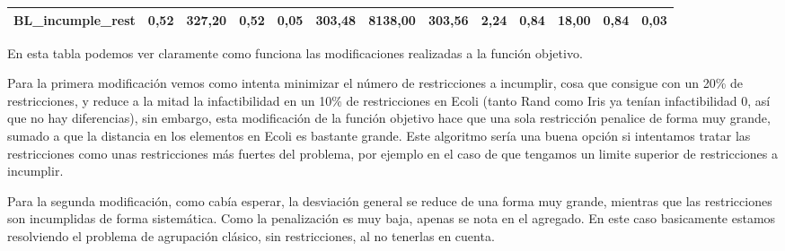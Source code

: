 \documentclass[12pt, spanish]{article}
\begin{document}
\begin{table}[H]
\begin{adjustwidth}{-1.9cm}{-1.9cm}
\begin{tabular}{|l|c|c|c|c|c|c|c|c|c|c|c|c|}
BL\_incumple\_rest                                      & 0,52                         & 327,20                         & 0,52                      & 0,05                   & 303,48                       & 8138,00                        & 303,56                    & 2,24                   & 0,84                         & 18,00                          & 0,84                      & 0,03               \\ \hline   
\end{tabular}

\end{adjustwidth}
\end{table}

En esta tabla podemos ver claramente como funciona las modificaciones realizadas a la función objetivo.

Para la primera modificación vemos como intenta minimizar el número de restricciones a incumplir, cosa que consigue con un 20\% de restricciones, y reduce a la mitad la infactibilidad en un 10\% de restricciones en Ecoli (tanto Rand como Iris ya tenían infactibilidad 0, así que no hay diferencias), sin embargo, esta modificación de la función objetivo hace que una sola restricción penalice de forma muy grande, sumado a que la distancia en los elementos en Ecoli es bastante grande. Este algoritmo sería una buena opción si intentamos tratar las restricciones como unas restricciones más fuertes del problema, por ejemplo en el caso de que tengamos un limite superior de restricciones a incumplir. 


Para la segunda modificación, como cabía esperar, la desviación general se reduce de una forma muy grande, mientras que las restricciones son incumplidas de forma sistemática. Como la penalización es muy baja, apenas se nota en el agregado. En este caso basicamente estamos resolviendo el problema de agrupación clásico, sin restricciones, al no tenerlas en cuenta.
\end{document}
